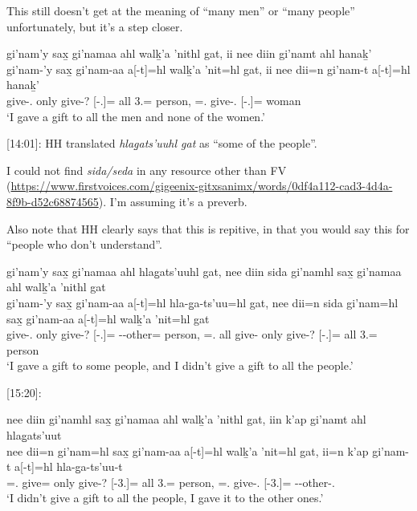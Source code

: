 This still doesn't get at the meaning of ``many men'' or ``many people'' unfortunately, but it's a step closer.


\begin{exe}
    \ex \glll gi'nam'y  sax̱ gi'namaa ahl walḵ'a 'nithl gat, ii nee diin gi'namt ahl hanaḵ' \\
    gi'nam-'y  sax̱ gi'nam-aa a[-t]=hl walḵ'a 'nit=hl gat, ii nee dii=n gi'nam-t a[-t]=hl hanaḵ' \\
    give-\Fsg{}.\Ii{} only give-\Nmlz{}? \Prep{}[-\Ssg{}.\Ii{}]=\Cn{} all 3.\Iii{}=\Cn{} person, \Ccnj{} \Neg{} \Foc{}=\Fsg{}.\I{} give-\Tsg{}.\Ii{} \Prep{}[-\Ssg{}.\Ii{}]=\Cn{} woman \\
    `I gave a gift to all the men and none of the women.' 
\end{exe}

[14:01]: HH translated \textit{hlag̱ats'uuhl gat} as ``some of the people''.

I could not find \textit{sida/seda} in any resource other than FV (\url{https://www.firstvoices.com/gigeenix-gitxsanimx/words/0df4a112-cad3-4d4a-8f9b-d52c68874565}). I'm assuming it's a preverb.

Also note that HH clearly says that this is repitive, in that you would say this for ``people who don't understand''.

\begin{exe}
    \ex \glll gi'nam'y sax̱ gi'namaa ahl hlag̱ats'uuhl gat, nee diin sida gi'namhl sax̱ gi'namaa ahl walḵ'a 'nithl gat \\
    gi'nam-'y  sax̱ gi'nam-aa a[-t]=hl hla-g̱a-ts'uu=hl gat, nee dii=n sida gi'nam=hl sax̱ gi'nam-aa a[-t]=hl walḵ'a 'nit=hl gat  \\
    give-\Fsg{}.\Ii{} only give-\Nmlz{}? \Prep{}[-\Ssg{}.\Ii{}]=\Cn{} \Part{}-\Distr{}-other=\Cn{} person, \Neg{} \Foc{}=\Fsg{}.\I{} all give-\Cn{} only give-\Nmlz{}? \Prep{}[-\Ssg{}.\Ii{}]=\Cn{} all 3.\I{}=\Cn{} person \\
    `I gave a gift to some people, and I didn't give a gift to all the people.' 
\end{exe}

[15:20]:

\begin{exe}
    \ex \glll nee diin gi'namhl sax̱ gi'namaa ahl walḵ'a 'nithl gat, iin k'ap gi'namt ahl  hlag̱ats'uut \\
    nee dii=n gi'nam=hl sax̱ gi'nam-aa a[-t]=hl walḵ'a 'nit=hl gat, ii=n k'ap gi'nam-t a[-t]=hl hla-g̱a-ts'uu-t \\
    \Neg{} \Foc{}=\Fsg{}.\I{} give=\Cn{} only give-\Nmlz{}? \Obl{}[-3.\Ii{}]=\Cn{} all 3.\I{}=\Cn{} person, \Ccnj{}=\Fsg{}.\I{} \Verum{} give-\Tsg{}.\Ii{} \Obl{}[-3.\Ii{}]=\Cn{} \Part{}-\Distr{}-other-\Tsg{}.\Ii{} \\
    `I didn't give a gift to all the people, I gave it to the other ones.' 
\end{exe}

